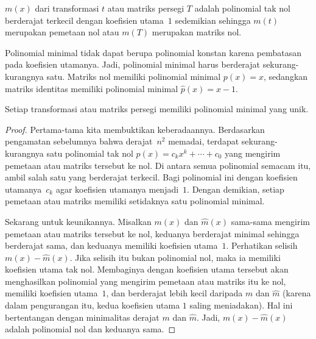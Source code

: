 \begin{definition}
%
\( m(x) \) dari transformasi \( t \)
atau matriks persegi \( T \) adalah
polinomial tak nol berderajat terkecil dengan koefisien utama~\( 1 \)
sedemikian sehingga \( m(t) \) merupakan pemetaan nol atau \( m(T) \) merupakan matriks nol.
\end{definition}

\noindent Polinomial minimal
tidak dapat berupa polinomial konstan karena
pembatasan pada koefisien utamanya.
Jadi, polinomial minimal
harus berderajat sekurang-kurangnya satu.
Matriks nol memiliki polinomial minimal $p(x)=x$, sedangkan
matriks identitas memiliki polinomial minimal $\hat{p}(x)=x-1$.

\begin{lemma}
Setiap transformasi atau matriks persegi memiliki polinomial minimal yang unik.
\end{lemma}

\begin{proof}
Pertama-tama kita membuktikan keberadaannya.
Berdasarkan pengamatan sebelumnya bahwa
derajat~$n^2$ memadai, terdapat sekurang-kurangnya satu
polinomial tak nol $p(x)=c_kx^k+\cdots+c_0$ yang
mengirim pemetaan atau matriks tersebut ke nol.
Di antara semua polinomial semacam itu,
ambil salah satu yang berderajat terkecil.
Bagi polinomial ini dengan koefisien utamanya~$c_k$ agar koefisien utamanya menjadi~$1$.
Dengan demikian, setiap pemetaan atau matriks memiliki setidaknya satu polinomial minimal.

Sekarang untuk keunikannya.
Misalkan
\( m(x) \) dan \( \hat{m}(x) \) sama-sama mengirim pemetaan atau matriks tersebut ke nol,
keduanya berderajat
minimal sehingga berderajat sama,
dan keduanya memiliki koefisien utama~$1$.
Perhatikan selisih \( m(x)-\hat{m}(x) \).
Jika selisih itu bukan polinomial nol, maka ia memiliki koefisien utama tak nol.
Membaginya dengan
koefisien utama tersebut akan menghasilkan polinomial yang mengirim
pemetaan atau matriks itu ke nol, memiliki koefisien utama~\( 1\), dan
berderajat lebih kecil daripada $m$ dan $\hat{m}$
(karena dalam pengurangan itu, kedua koefisien utama \( 1\) saling meniadakan).
Hal ini bertentangan dengan minimalitas derajat
$m$ dan $\hat{m}$.
Jadi, \( m(x)-\hat{m}(x) \) adalah polinomial nol dan
keduanya sama.
\end{proof}

